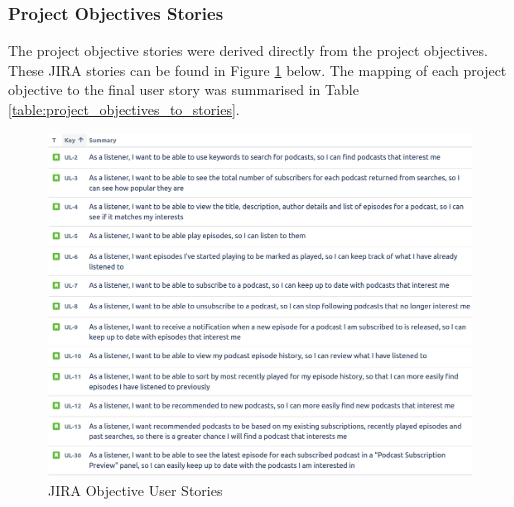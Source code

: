 \documentclass[12pt]{article}
\begin{document}
\subsubsection{Project Objectives Stories} \label{sec:project_objectives_stories}

The project objective stories were derived directly from the project objectives. These JIRA stories can be found in Figure \ref{fig:jira_stories} below.
The mapping of each project objective to the final user story was summarised in Table \ref{table:project_objectives_to_stories}.

\begin{figure}[ht]
    \centering
    \includegraphics[width=\textwidth]{resources/objective_stories}
    \caption{JIRA Objective User Stories}
    \label{fig:jira_stories}
\end{figure}
\end{document}
